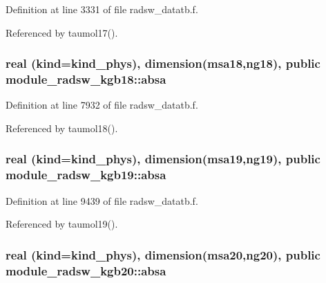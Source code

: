 Definition at line 3331 of file radsw\+\_\+datatb.\+f.



Referenced by taumol17().

\subsubsection[{\texorpdfstring{absa}{absa}}]{\setlength{\rightskip}{0pt plus 5cm}real (kind=kind\+\_\+phys), dimension(msa18,ng18), public module\+\_\+radsw\+\_\+kgb18\+::absa}\hypertarget{group__module__radsw__main_ga8a7787776bd057b1815e92a5f58b9cac}{}\label{group__module__radsw__main_ga8a7787776bd057b1815e92a5f58b9cac}


Definition at line 7932 of file radsw\+\_\+datatb.\+f.



Referenced by taumol18().

\subsubsection[{\texorpdfstring{absa}{absa}}]{\setlength{\rightskip}{0pt plus 5cm}real (kind=kind\+\_\+phys), dimension(msa19,ng19), public module\+\_\+radsw\+\_\+kgb19\+::absa}\hypertarget{group__module__radsw__main_gad9a6fc80122a2f06d9f2277d74e00c85}{}\label{group__module__radsw__main_gad9a6fc80122a2f06d9f2277d74e00c85}


Definition at line 9439 of file radsw\+\_\+datatb.\+f.



Referenced by taumol19().

\subsubsection[{\texorpdfstring{absa}{absa}}]{\setlength{\rightskip}{0pt plus 5cm}real (kind=kind\+\_\+phys), dimension(msa20,ng20), public module\+\_\+radsw\+\_\+kgb20\+::absa}\hypertarget{group__module__radsw__main_ga405eabf194b1216dd083c2344e80f5b4}{}\label{group__module__radsw__main_ga405eabf194b1216dd083c2344e80f5b4}


